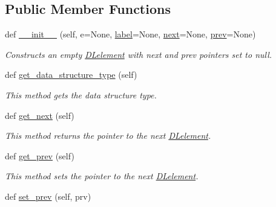 \subsection*{Public Member Functions}
\begin{DoxyCompactItemize}
\item 
def \mbox{\hyperlink{class_bridges_1_1_d_lelement_1_1_d_lelement_ab25b4475c850ba7ec3b326df8e43e861}{\+\_\+\+\_\+init\+\_\+\+\_\+}} (self, e=None, \mbox{\hyperlink{class_bridges_1_1_element_1_1_element_a301fe5be8cf72b2c62f6a218feeb9166}{label}}=None, \mbox{\hyperlink{class_bridges_1_1_s_lelement_1_1_s_lelement_a650935f5a68b49de4c222cc4c8b0c778}{next}}=None, \mbox{\hyperlink{class_bridges_1_1_d_lelement_1_1_d_lelement_a08e7ba4d3ea7b49409b470752ca75ad1}{prev}}=None)
\begin{DoxyCompactList}\small\item\em Constructs an empty \mbox{\hyperlink{class_bridges_1_1_d_lelement_1_1_d_lelement}{D\+Lelement}} with next and prev pointers set to null. \end{DoxyCompactList}\item 
def \mbox{\hyperlink{class_bridges_1_1_d_lelement_1_1_d_lelement_af8a80f719f6f8c7b9f5e45fe11d250ea}{get\+\_\+data\+\_\+structure\+\_\+type}} (self)
\begin{DoxyCompactList}\small\item\em This method gets the data structure type. \end{DoxyCompactList}\item 
def \mbox{\hyperlink{class_bridges_1_1_d_lelement_1_1_d_lelement_ab3aae005a6e37d25b7d7c6c4cb1bdecf}{get\+\_\+next}} (self)
\begin{DoxyCompactList}\small\item\em This method returns the pointer to the next \mbox{\hyperlink{class_bridges_1_1_d_lelement_1_1_d_lelement}{D\+Lelement}}. \end{DoxyCompactList}\item 
def \mbox{\hyperlink{class_bridges_1_1_d_lelement_1_1_d_lelement_a012742f29626676f4e99d1f54e9dd10d}{get\+\_\+prev}} (self)
\begin{DoxyCompactList}\small\item\em This method sets the pointer to the next \mbox{\hyperlink{class_bridges_1_1_d_lelement_1_1_d_lelement}{D\+Lelement}}. \end{DoxyCompactList}\item 
def \mbox{\hyperlink{class_bridges_1_1_d_lelement_1_1_d_lelement_a34acbe81af0c0c90640383363fe0aadc}{set\+\_\+prev}} (self, prv)

\end{DoxyCompactItemize}
